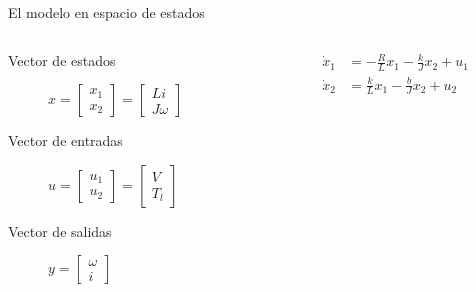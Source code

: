 \documentclass[presentation,aspectratio=169]{beamer}
\begin{document}
\begin{frame}[label={sec:org2e4f25e}]{El modelo en espacio de estados}
\begin{columns}
\begin{column}{0.4\columnwidth}
\begin{description}
\item[{Vector de estados}] \(x = \begin{bmatrix} x_1 \\x_2 \end{bmatrix} = \begin{bmatrix} Li \\J\omega \end{bmatrix}\)
\item[{Vector de entradas}] \(u =  \begin{bmatrix} u_1 \\ u_2 \end{bmatrix} = \begin{bmatrix} V\\ T_l \end{bmatrix}\)
\item[{Vector de salidas}] \(y =  \begin{bmatrix}\omega\\ i \end{bmatrix}\)
\end{description}
\end{column}



\begin{column}{0.6\columnwidth}
\begin{align*}
  \dot{x}_1  &= - \frac{R}{L}x_1 - \frac{k}{J}x_2 + u_1\\
  \dot{x}_2  &=  \frac{k}{L}x_1 - \frac{b}{J}x_2 + u_2
\end{align*}


\end{column}
\end{columns}
\end{frame}
\end{document}
